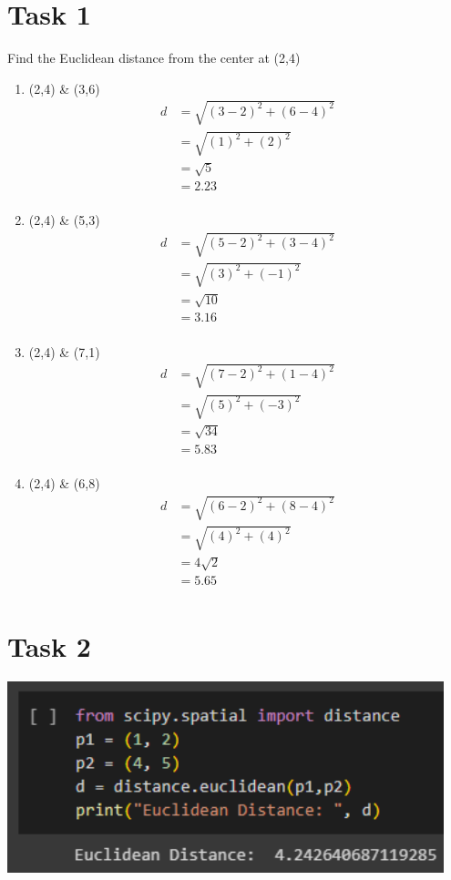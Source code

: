 \documentclass[12pt,titlepage]{article}
\begin{document}
\section*{Task 1}
Find the Euclidean distance from the center at (2,4)
\begin{enumerate}
    \item (2,4) \& (3,6)
    \begin{align*}
        d &= \sqrt{(3-2)^2+(6-4)^2} \\
        &= \sqrt{(1)^2+(2)^2} \\
        &= \sqrt{5} \\
        &= 2.23 \\
    \end{align*} 
    \item (2,4) \& (5,3)
    \begin{align*}
        d &= \sqrt{(5-2)^2+(3-4)^2} \\
        &= \sqrt{(3)^2+(-1)^2} \\
        &= \sqrt{10} \\
        &= 3.16 \\
    \end{align*}
    \item (2,4) \& (7,1)
    \begin{align*}
        d &= \sqrt{(7-2)^2+(1-4)^2} \\
        &= \sqrt{(5)^2+(-3)^2} \\
        &= \sqrt{34} \\
        &= 5.83 \\
    \end{align*}
    \item (2,4) \& (6,8)
    \begin{align*}
        d &= \sqrt{(6-2)^2+(8-4)^2} \\
        &= \sqrt{(4)^2+(4)^2} \\
        &= 4\sqrt{2} \\
        &= 5.65 \\
    \end{align*}
\end{enumerate}

\newpage

\section*{Task 2}

\includegraphics[width=0.95\textwidth]{images/figures/fig1.png}
\end{document}
